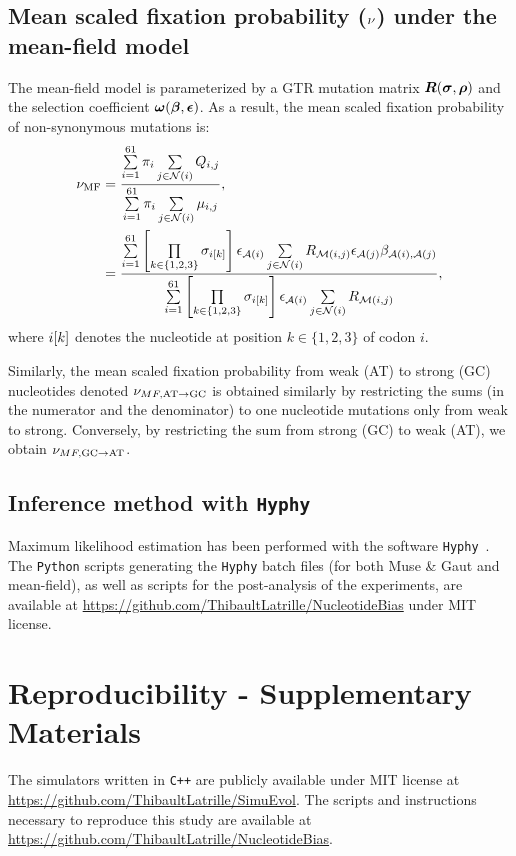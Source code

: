 \documentclass{article}
\begin{document}
\subsection{Mean scaled fixation probability (\texorpdfstring{$\nu$}{ν}) under the mean-field model}
\label{sec:mut-bias-mean-field-omega}
The mean-field model is parameterized by a {GTR} mutation matrix $\bm{R}(\bm{\sigma}, \bm{\rho})$ and the selection coefficient $\bm{\omega}(\bm{\beta}, \bm{\epsilon})$.
As a result, the mean scaled fixation probability of {non-synonymous} mutations is:
\begin{align}
    \nu_{\text{{MF}}} & = \dfrac{ \sum\limits_{{i}=1}^{61} \pi_{{i}} \sum\limits_{{j} \in \mathcal{N}\left({i}\right)} Q_{{i}, {j}}}{ \sum\limits_{{i}=1}^{61} \pi_{{i}} \sum\limits_{{j} \in \mathcal{N}\left({i}\right)} \mu_{{i}, {j}}}, \\
    & = \dfrac{ \sum\limits_{{i}=1}^{61} \left[\prod\limits_{k \in \{ 1, 2, 3 \}} \sigma_{{i}[k]}\right] \epsilon_{\mathcal{A}({i})} \sum\limits_{{j} \in \mathcal{N}\left({i}\right)} R_{\mathcal{M}({i}, {j})} \epsilon_{\mathcal{A}({j})} \beta_{\mathcal{A}({i}), \mathcal{A}({j})} }{\sum\limits_{{i}=1}^{61} \left[\prod\limits_{k \in \{ 1, 2, 3 \}} \sigma_{{i}[k]}\right] \epsilon_{\mathcal{A}({i})} \sum\limits_{{j} \in \mathcal{N}\left({i}\right)} R_{\mathcal{M}({i}, {j})}},
\end{align}
where ${i}[k]$ denotes the nucleotide at position $k \in \{ 1, 2, 3 \}$ of codon $i$.

Similarly, the mean scaled fixation probability from weak (AT) to strong (GC) nucleotides denoted $\nu_{MF, \text{AT} \rightarrow \text{GC}}$ is obtained similarly by restricting the sums (in the numerator and the denominator) to one nucleotide mutations only from weak to strong.
Conversely, by restricting the sum from strong (GC) to weak (AT), we obtain $\nu_{MF, \text{GC} \rightarrow \text{AT}}$.

\subsection{Inference method with \texttt{Hyphy}}
\label{subsec:inference-method-with-hyphy}

Maximum {likelihood} estimation has been performed with the software \texttt{Hyphy}~\citep{Pond2005}.
The \texttt{Python} scripts generating the \texttt{Hyphy} batch files (for both Muse \& Gaut and mean-field), as well as scripts for the post-analysis of the experiments, are available at \url{https://github.com/ThibaultLatrille/NucleotideBias} under MIT license.

\section{Reproducibility - Supplementary Materials}
The simulators written in \texttt{C++} are publicly available under MIT license at \url{https://github.com/ThibaultLatrille/SimuEvol}.
The scripts and instructions necessary to reproduce this study are available at \url{https://github.com/ThibaultLatrille/NucleotideBias}.
\end{document}
